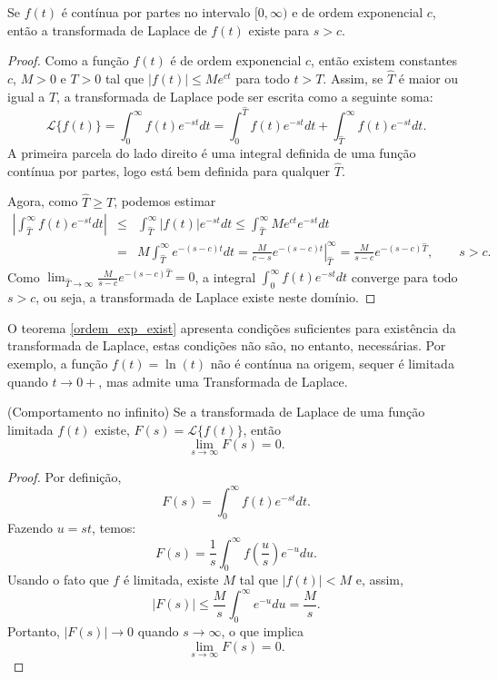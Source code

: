 \begin{teo}\label{ordem_exp_exist} Se $f(t)$ é contínua por partes no intervalo $[0,\infty)$ e de ordem exponencial $c$, então a transformada de Laplace de $f(t)$ existe para $s>c$.
\end{teo}
\begin{proof}Como a função $f(t)$ é de ordem exponencial $c$, então existem constantes $c$, $M>0$ e $T>0$ tal que $|f(t)|\leq M e^{ct}$ para todo $t>T$. Assim, se $\hat{T}$ é maior ou igual a $T$, a transformada de Laplace  pode ser escrita como a seguinte soma:
$$
\mathcal{L}\{f(t)\}=\int_0^\infty f(t)e^{-st}dt=\int_0^{\hat{T}} f(t)e^{-st}dt+\int_{\hat{T}}^\infty f(t)e^{-st}dt.
$$
A primeira parcela do lado direito é uma integral definida de uma função contínua por partes, logo está bem definida para qualquer $\hat{T}$.

Agora, como $\hat{T}\geq T$, podemos estimar
\begin{eqnarray*}
\left|\int_{\hat{T}}^\infty f(t)e^{-st}dt\right|&\leq& \int_{\hat{T}}^\infty \left|f(t)\right|e^{-st}dt\leq \int_{\hat{T}}^\infty M e^{ct}e^{-st}dt\\
&=&M \int_{\hat{T}}^\infty e^{-(s-c)t}dt
=\left.\frac{M}{c-s} e^{-(s-c)t}\right|_{\hat{T}}^\infty =\frac{M}{s-c}e^{-(s-c)\hat{T}} ,\qquad s>c.
\end{eqnarray*}
Como $\lim_{\hat{T}\to \infty} \frac{M}{s-c}e^{-(s-c)\hat{T}}=0$, a integral $\int_0^\infty f(t)e^{-st}dt$ converge para todo $s>c$, ou seja, a transformada de Laplace existe neste domínio.
\end{proof}

\begin{obs} O teorema \ref{ordem_exp_exist} apresenta condições suficientes para existência da transformada de Laplace, estas condições não são, no entanto, necessárias. Por exemplo, a função $f(t)=\ln(t)$ não é contínua na origem, sequer é limitada quando $t\to 0+$, mas admite uma Transformada de Laplace.
 \end{obs}


\begin{teo} (Comportamento no infinito) Se a transformada de Laplace de uma função limitada $f(t)$ existe, $F(s)=\mathcal{L}\{f(t)\}$, então
$$
\lim_{s\to\infty}F(s)=0.
$$
\end{teo}
\begin{proof}
 Por definição,
 $$
 F(s)=\int_0^\infty f(t)e^{-st}dt.
 $$
Fazendo $u=st$, temos:
$$
 F(s)=\frac{1}{s}\int_0^\infty f\left(\frac{u}{s}\right)e^{-u}du.
 $$
 Usando o fato que $f$ é limitada, existe $M$ tal que $|f(t)|<M$ e, assim,
$$
| F(s) |\leq \frac{M}{s}\int_0^\infty e^{-u}du = \frac{M}{s}.
 $$ 
 Portanto, $|F(s)|\to 0$ quando $s\to \infty$, o que implica 
 $$
\lim_{s\to\infty}F(s)=0.
$$
 
\end{proof}

